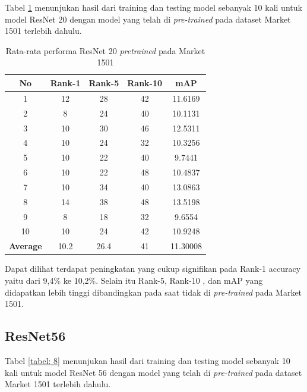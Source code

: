 Tabel \ref{tabel: 7} menunjukan hasil dari training dan testing model sebanyak 10 kali untuk model ResNet 20 dengan model yang telah di \textit{pre-trained} pada dataset Market 1501 terlebih dahulu.

\vspace{1ex}

\begin{longtable}{|c|c|c|c|c|}
	\caption{Rata-rata performa ResNet 20 \textit{pretrained} pada Market 1501 }
	\label{tabel: 7}\\
	\hline
	\rowcolor[HTML]{C0C0C0}
	\textbf{No} &\textbf{Rank-1} & \textbf{Rank-5} & \textbf{Rank-10} & \textbf{mAP} \\
	\hline
	1 & 12 & 28 & 42 & 11.6169\\
	2 & 8 & 24 & 40 & 10.1131\\
	3 & 10 & 30 & 46 & 12.5311\\
	4 & 10 & 24 & 32 & 10.3256\\
	5 & 10 & 22 & 40 & 9.7441\\
	6 & 10 & 22 & 48 & 10.4837\\
	7 & 10 & 34 & 40 & 13.0863\\
	8 & 14 & 38 & 48 & 13.5198\\
	9 & 8 & 18 & 32 & 9.6554\\
	10 & 10 & 24 & 42 & 10.9248\\
	\hline
	\textbf{Average} & 10.2 & 26.4 & 41 & 11.30008\\
	\hline
\end{longtable}

\vspace{1ex}
Dapat dilihat terdapat peningkatan yang cukup signifikan pada Rank-1 accuracy yaitu dari 9,4\% ke 10,2\%. Selain itu Rank-5, Rank-10 , dan mAP yang didapatkan lebih tinggi dibandingkan pada saat tidak di \textit{pre-trained} pada Market 1501.

\subsection{ResNet56}

Tabel \ref{tabel: 8} menunjukan hasil dari training dan testing model sebanyak 10 kali untuk model ResNet 56 dengan model yang telah di \textit{pre-trained} pada dataset Market 1501 terlebih dahulu.

\vspace{1ex}

